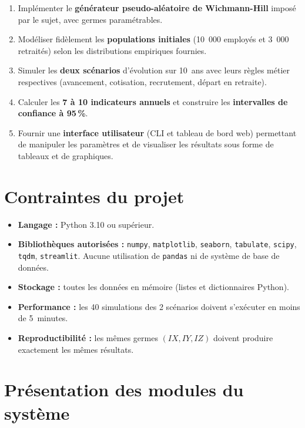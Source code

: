 \documentclass[12pt,a4paper,oneside]{report}
\newcommand{\code}[1]{\texttt{\color{primary}#1}}
\begin{document}
\begin{enumerate}
  \item Implémenter le \textbf{générateur pseudo-aléatoire de
        Wichmann-Hill} imposé par le sujet, avec germes paramétrables.
  \item Modéliser fidèlement les \textbf{populations initiales}
        (10~000 employés et 3~000 retraités) selon les distributions
        empiriques fournies.
  \item Simuler les \textbf{deux scénarios} d'évolution sur 10~ans avec
        leurs règles métier respectives (avancement, cotisation,
        recrutement, départ en retraite).
  \item Calculer les \textbf{7 à 10 indicateurs annuels} et construire
        les \textbf{intervalles de confiance à 95\,\%}.
  \item Fournir une \textbf{interface utilisateur} (CLI et tableau de
        bord web) permettant de manipuler les paramètres et de visualiser
        les résultats sous forme de tableaux et de graphiques.
\end{enumerate}

\section{Contraintes du projet}

\begin{itemize}
  \item \textbf{Langage :} Python 3.10 ou supérieur.
  \item \textbf{Bibliothèques autorisées :} \code{numpy},
        \code{matplotlib}, \code{seaborn}, \code{tabulate}, \code{scipy},
        \code{tqdm}, \code{streamlit}. Aucune utilisation de
        \code{pandas} ni de système de base de données.
  \item \textbf{Stockage :} toutes les données en mémoire (listes et
        dictionnaires Python).
  \item \textbf{Performance :} les 40 simulations des 2 scénarios doivent
        s'exécuter en moins de 5~minutes.
  \item \textbf{Reproductibilité :} les mêmes germes
        $(IX, IY, IZ)$ doivent produire exactement les mêmes résultats.
\end{itemize}

\section{Présentation des modules du système}
\end{document}
